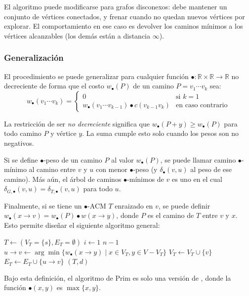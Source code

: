 \documentclass[a4paper]{report}
\newcommand{\si}{\text{si }}
\newcommand{\ecc}{\text{en caso contrario}}
\newcommand{\R}{\mathbb{R}}
\begin{document}
El algoritmo puede modificarse para grafos disconexos: debe mantener un conjunto de vértices conectados, y frenar cuando no quedan nuevos vértices por explorar. El comportamiento en ese caso es devolver los caminos mínimos a los vértices alcanzables (los demás están a distancia $\infty$).

\subsubsection{Generalización}

El procedimiento se puede generalizar para cualquier función $\bullet: \R \times \R \longrightarrow \R$ no decreciente de forma que el costo $w_\bullet(P)$ de un camino $P = v_1 \cdots v_k$ sea:
$$
    w_\bullet(v_1 \cdots v_k) =
    \begin{cases}
        0                                                    & \si k = 1 \\
        w_\bullet(v_1 \cdots v_{k-1}) \bullet c(v_{k-1} v_k) & \ecc
    \end{cases}
$$

La restricción de ser \textit{no decreciente} significa que $w_\bullet(P + y) \geq w_\bullet(P)$ para todo camino $P$ y vértice $y$. La suma cumple esto solo cuando los pesos son no negativos.

Si se define $\bullet$-peso de un camino $P$ al valor $w_\bullet(P)$, se puede llamar camino $\bullet$-mínimo al camino entre $v$ y $u$ con menor $\bullet$-peso (y $\delta_\bullet(v, u)$ al peso de ese camino). Más aún, el árbol de caminos $\bullet$-mínimos de $v$ es uno en el cual $\delta_{G,\bullet}(v, u) = \delta_{T, \bullet}(v, u)$ para todo $u$.

Finalmente, si se tiene un $\bullet$-ACM $T$ enraizado en $v$, se puede definir $w_\bullet(x \rightarrow v) = w_\bullet(P) \bullet w(x \rightarrow y)$, donde $P$ es el camino de $T$ entre $v$ y $x$. Esto permite diseñar el siguiente algoritmo general:

\begin{codebox}
    \li $T \gets (V_T = \{s\}, E_T = \emptyset)$
    \li \For $i \gets 1$ \To $n - 1$ \Do
    \li $u \rightarrow v \gets \arg\min{\{w_\bullet(x \rightarrow y) \mid x \in V_T, y \in V - V_T\}}$
    \li $V_T \gets V_T \cup \{v\}$
    \li $E_T \gets E_T \cup \{u \rightarrow v\}$
    \End
    \li \Return $(T, d)$
\end{codebox}

Bajo esta definición, el algoritmo de Prim es solo una versión de , donde la función $\bullet(x, y)$ es $\max{\{x, y\}}$.
\end{document}
